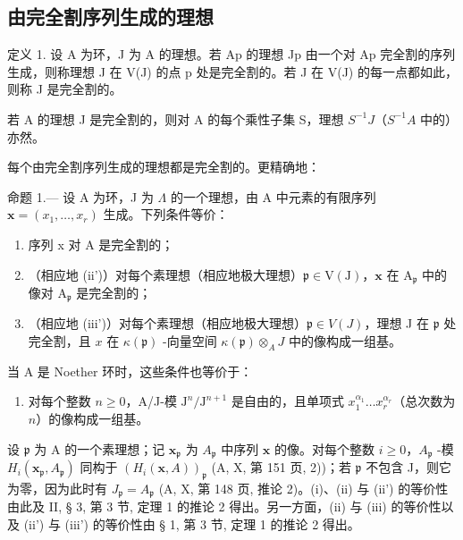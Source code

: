 \subsection{由完全割序列生成的理想}

定义 1. 设 A 为环，J 为 A 的理想。若 Ap 的理想 Jp 由一个对 Ap 完全割的序列生成，则称理想 J 在 V(J) 的点 p 处是完全割的。若 J 在 V(J) 的每一点都如此，则称 J 是完全割的。

若 A 的理想 J 是完全割的，则对 A 的每个乘性子集 S，理想 \(S^{-1}J\)（\(S^{-1}A\) 中的）亦然。

每个由完全割序列生成的理想都是完全割的。更精确地：

命题 1.--- 设 A 为环，J 为 \(\Lambda\) 的一个理想，由 A 中元素的有限序列 \(\mathbf{x} = (x_1, \ldots, x_r)\) 生成。下列条件等价：

\begin{enumerate}
\def\labelenumi{(\roman{enumi})}
\item
  序列 x 对 A 是完全割的；
\item
  （相应地 (ii')）对每个素理想（相应地极大理想）\(\mathfrak{p} \in \mathrm{V}(\mathrm{J})\)，\(\mathbf{x}\) 在 \(\mathrm{A}_{\mathfrak{p}}\) 中的像对 \(\mathrm{A}_{\mathfrak{p}}\) 是完全割的；
\item
  （相应地 (iii')）对每个素理想（相应地极大理想）\(\mathfrak{p} \in V(J)\)，理想 J 在 \(\mathfrak{p}\) 处完全割，且 \(x\) 在 \(\kappa(\mathfrak{p})\) -向量空间 \(\kappa(\mathfrak{p}) \otimes_{A} J\) 中的像构成一组基。
\end{enumerate}

当 A 是 Noether 环时，这些条件也等价于：

\begin{enumerate}
\def\labelenumi{(\roman{enumi})}
\setcounter{enumi}{3}
\tightlist
\item
  对每个整数 \(n \geqslant 0\)，A/J-模 \(\mathrm{J}^n/\mathrm{J}^{n+1}\) 是自由的，且单项式 \(x_1^{\alpha_1} \ldots x_r^{\alpha_r}\)（总次数为 \(n\)）的像构成一组基。
\end{enumerate}

设 \(\mathfrak{p}\) 为 A 的一个素理想；记 \(\mathbf{x}_{\mathfrak{p}}\) 为 \(A_{\mathfrak{p}}\) 中序列 \(\mathbf{x}\) 的像。对每个整数 \(i \geqslant 0\)，\(A_{\mathfrak{p}}\) -模 \(H_i(\mathbf{x}_{\mathfrak{p}}, A_{\mathfrak{p}})\) 同构于 \((H_i(\mathbf{x}, A))_{\mathfrak{p}}\) (A, X, 第 151 页, 2))；若 \(\mathfrak{p}\) 不包含 J，则它为零，因为此时有 \(J_{\mathfrak{p}} = A_{\mathfrak{p}}\) (A, X, 第 148 页, 推论 2)。(i)、(ii) 与 (ii') 的等价性由此及 II, § 3, 第 3 节, 定理 1 的推论 2 得出。另一方面，(ii) 与 (iii) 的等价性以及 (ii') 与 (iii') 的等价性由 § 1, 第 3 节, 定理 1 的推论 2 得出。

